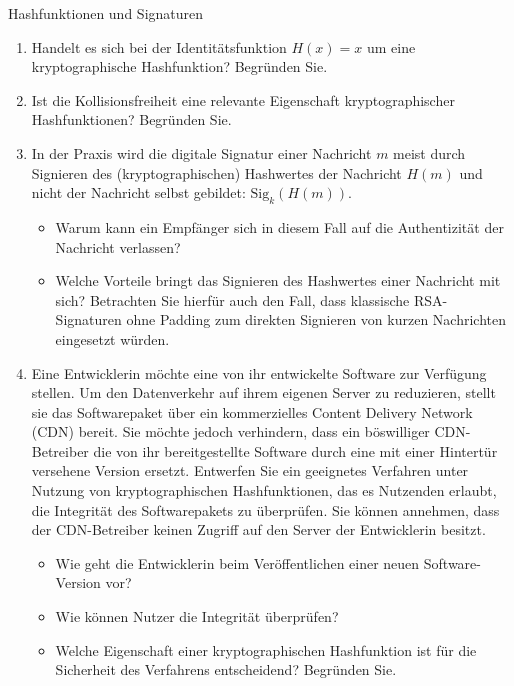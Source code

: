 \documentclass{article}
\begin{document}
\setcounter{subsection}{125}
\begin{exercise}{Hashfunktionen und Signaturen}
  \begin{enumerate}
    \item Handelt es sich bei der Identitätsfunktion $H(x) = x$ um eine kryptographische Hashfunktion? Begründen Sie.
    \item Ist die Kollisionsfreiheit eine relevante Eigenschaft kryptographischer Hashfunktionen? Begründen Sie.
    \item In der Praxis wird die digitale Signatur einer Nachricht $m$ meist durch Signieren des (kryptographischen) Hashwertes der Nachricht $H(m)$ und nicht der Nachricht selbst gebildet: $\text{Sig}_k(H(m))$.
      \begin{itemize}
        \item Warum kann ein Empfänger sich in diesem Fall auf die Authentizität der Nachricht verlassen?
        \item Welche Vorteile bringt das Signieren des Hashwertes einer Nachricht mit sich? Betrachten Sie hierfür auch den Fall, dass klassische RSA-Signaturen ohne Padding zum direkten Signieren von kurzen Nachrichten eingesetzt würden.
      \end{itemize}
    \item Eine Entwicklerin möchte eine von ihr entwickelte Software zur Verfügung stellen. Um den Datenverkehr auf ihrem eigenen Server zu reduzieren, stellt sie das Softwarepaket über ein kommerzielles Content Delivery Network (CDN) bereit. Sie möchte jedoch verhindern, dass ein böswilliger CDN-Betreiber die von ihr bereitgestellte Software durch eine mit einer Hintertür versehene Version ersetzt. Entwerfen Sie ein geeignetes Verfahren unter Nutzung von kryptographischen Hashfunktionen, das es Nutzenden erlaubt, die Integrität des Softwarepakets zu überprüfen. Sie können annehmen, dass der CDN-Betreiber keinen Zugriff auf den Server der Entwicklerin besitzt.
      \begin{itemize}
        \item Wie geht die Entwicklerin beim Veröffentlichen einer neuen Software-Version vor?
        \item Wie können Nutzer die Integrität überprüfen?
        \item Welche Eigenschaft einer kryptographischen Hashfunktion ist für die Sicherheit des Verfahrens entscheidend? Begründen Sie.
      \end{itemize}
  \end{enumerate}


\end{exercise}
\end{document}
